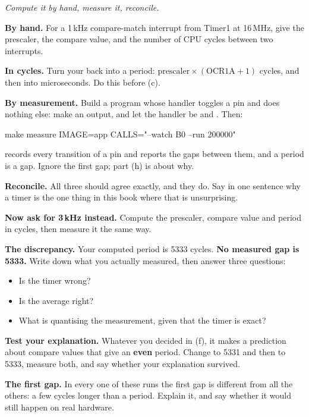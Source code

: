 \label{c5:ex:crosscheck}
\emph{Compute it by hand, measure it, reconcile.}
\begin{parts}
  \item \textbf{By hand.} For a 1\,kHz compare-match interrupt from Timer1 at 16\,MHz, give the
    prescaler, the compare value, and the number of CPU cycles between two interrupts.
  \item \textbf{In cycles.} Turn your  back into a period:
    $\text{prescaler} \times (\mathrm{OCR1A} + 1)$ cycles, and then into microseconds. Do this
    before (c).
  \item \textbf{By measurement.} Build a program whose handler toggles a pin and does nothing
    else: make  an output, and let the handler be  and .
    Then:
\begin{shell}
make measure IMAGE=app CALLS="--watch B0 --run 200000"
\end{shell}
     records every transition of a pin and reports the gaps between them, and a
    period is a gap. Ignore the first gap; part (h) is about why.
  \item \textbf{Reconcile.} All three should agree exactly, and they do. Say in one sentence why a
    timer is the one thing in this book where that is unsurprising.
  \item \textbf{Now ask for 3\,kHz instead.} Compute the prescaler, compare value and period in
    cycles, then measure it the same way.
  \item \textbf{The discrepancy.} Your computed period is 5333 cycles. \textbf{No measured gap is
    5333.} Write down what you actually measured, then answer three questions:
    \begin{itemize}
      \item Is the timer wrong?
      \item Is the average right?
      \item What is quantising the measurement, given that the timer is exact?
    \end{itemize}
  \item \textbf{Test your explanation.} Whatever you decided in (f), it makes a prediction about
    compare values that give an \textbf{even} period. Change  to 5331 and then to 5333,
    measure both, and say whether your explanation survived.
  \item \textbf{The first gap.} In every one of these runs the first gap is different from all the
    others: a few cycles longer than a period. Explain it, and say whether it would still happen on
    real hardware.
\end{parts}

